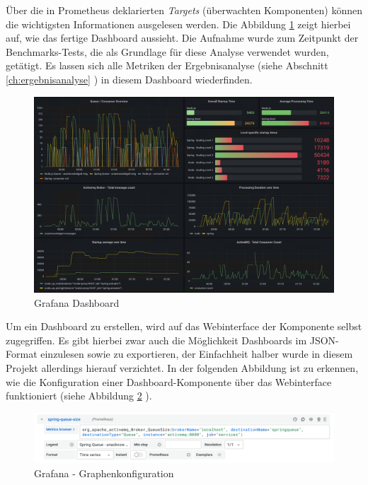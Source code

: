 Über die in Prometheus deklarierten \emph{Targets} (überwachten Komponenten) können die wichtigsten Informationen ausgelesen werden. Die Abbildung \ref{fig:grafanaOverview}  zeigt hierbei auf, wie das fertige Dashboard aussieht. Die Aufnahme wurde zum Zeitpunkt der Benchmarks-Tests, die als Grundlage für diese Analyse verwendet wurden, getätigt. Es lassen sich alle Metriken der Ergebnisanalyse (siehe Abschnitt \ref{ch:ergebnisanalyse} ) in diesem Dashboard wiederfinden. 

\begin{figure}
	\centering
	\includegraphics[width=\linewidth]{kapitel/problemloesung/implementierung/_img/grafana-dashboard-01}
	\caption[]{Grafana Dashboard}
	\label{fig:grafanaOverview}
\end{figure}

Um ein Dashboard zu erstellen, wird auf das Webinterface der Komponente selbst zugegriffen. Es gibt hierbei zwar auch die Möglichkeit Dashboards im JSON-Format einzulesen sowie zu exportieren, der Einfachheit halber wurde in diesem Projekt allerdings hierauf verzichtet. In der folgenden Abbildung ist zu erkennen, wie die Konfiguration einer Dashboard-Komponente über das Webinterface funktioniert (siehe Abbildung \ref{fig:grafanaPromQl} ). 

\begin{figure}
	\centering
	\includegraphics[width=\linewidth]{kapitel/problemloesung/implementierung/_img/grafana-promql}
	\caption[]{Grafana - Graphenkonfiguration}
	\label{fig:grafanaPromQl}
\end{figure}


